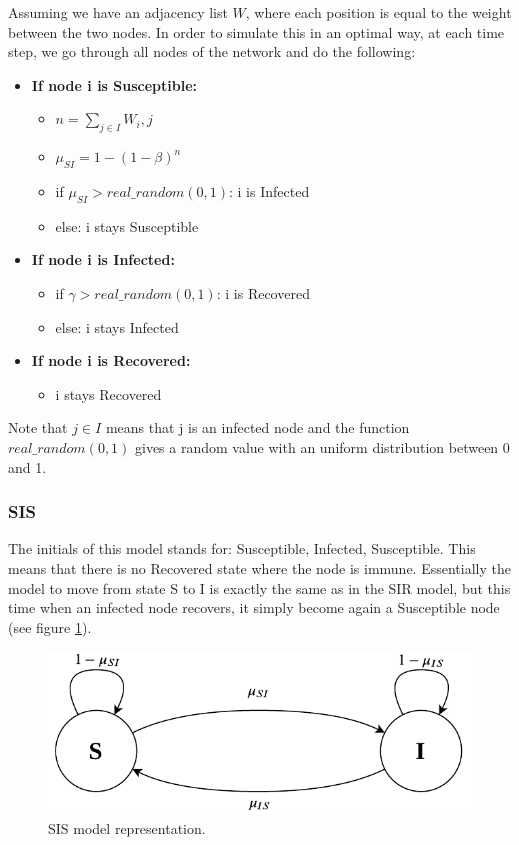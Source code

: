 Assuming we have an adjacency list $W$, where each position is equal to the weight between the two nodes. In order to simulate this in an optimal way, at each time step, we go through all nodes of the network and do the following:
\begin{itemize}
    \item \textbf{If node i is Susceptible:} 
    \begin{itemize}
        \item[] $n=\sum_{j\in I}W_i,j$
        \item[] $\mu_{SI}=1-(1-\beta)^n$
        \item[] if $\mu_{SI}>real\_random(0,1)$: i is Infected
        \item[] else: i stays Susceptible  
    \end{itemize}
    \item \textbf{If node i is Infected:} 
    \begin{itemize}
        \item[] if $\gamma>real\_random(0,1)$: i is Recovered
        \item[] else: i stays Infected
    \end{itemize}
    \item \textbf{If node i is Recovered:} 
    \begin{itemize}
        \item[] i stays Recovered
    \end{itemize}
\end{itemize}
Note that $j\in I$ means that j is an infected node and the function $real\_random(0,1)$ gives a random value with an uniform distribution between 0 and 1.
\subsubsection{SIS}
The initials of this model stands for: Susceptible, Infected, Susceptible. This means that there is no Recovered state where the node is immune. Essentially the model to move from state S to I is exactly the same as in the SIR model, but this time when an infected node recovers, it simply become again a Susceptible node (see figure \ref{fig:sis}).
\begin{figure}[htbp]
    \centering
    \includegraphics[width=\linewidth]{../img/SIS_model.pdf}
    \caption{SIS model representation.}
    \label{fig:sis}
\end{figure}

